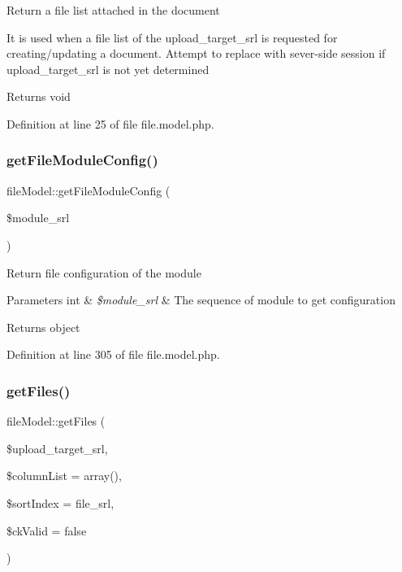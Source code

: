 Return a file list attached in the document

It is used when a file list of the upload\+\_\+target\+\_\+srl is requested for creating/updating a document. Attempt to replace with sever-\/side session if upload\+\_\+target\+\_\+srl is not yet determined

\begin{DoxyReturn}{Returns}
void 
\end{DoxyReturn}


Definition at line 25 of file file.\+model.\+php.

\hypertarget{classfileModel_aefe867916bce4a5f3451bb9afc464844}{}\label{classfileModel_aefe867916bce4a5f3451bb9afc464844} 
\subsubsection{\texorpdfstring{get\+File\+Module\+Config()}{getFileModuleConfig()}}
{\footnotesize\ttfamily file\+Model\+::get\+File\+Module\+Config (\begin{DoxyParamCaption}\item[{}]{\$module\+\_\+srl }\end{DoxyParamCaption})}

Return file configuration of the module


\begin{DoxyParams}[1]{Parameters}
int & {\em \$module\+\_\+srl} & The sequence of module to get configuration \\
\hline
\end{DoxyParams}
\begin{DoxyReturn}{Returns}
object 
\end{DoxyReturn}


Definition at line 305 of file file.\+model.\+php.

\hypertarget{classfileModel_ad311bb965a415b2e95253cdbd23c5406}{}\label{classfileModel_ad311bb965a415b2e95253cdbd23c5406} 
\subsubsection{\texorpdfstring{get\+Files()}{getFiles()}}
{\footnotesize\ttfamily file\+Model\+::get\+Files (\begin{DoxyParamCaption}\item[{}]{\$upload\+\_\+target\+\_\+srl,  }\item[{}]{\$column\+List = {\ttfamily array()},  }\item[{}]{\$sort\+Index = {\ttfamily \textquotesingle{}file\+\_\+srl\textquotesingle{}},  }\item[{}]{\$ck\+Valid = {\ttfamily false} }\end{DoxyParamCaption})}

